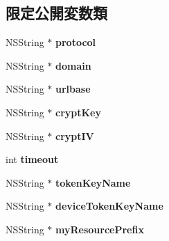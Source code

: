 \subsection*{限定公開変数類}
\begin{DoxyCompactItemize}
\item 
\hypertarget{interface_model_base_a524247cf1e9172c6c6cad9b20b621357}{}N\+S\+String $\ast$ {\bfseries protocol}\label{interface_model_base_a524247cf1e9172c6c6cad9b20b621357}

\item 
\hypertarget{interface_model_base_a23f933d9f0aecc684cbbdd7d18f47278}{}N\+S\+String $\ast$ {\bfseries domain}\label{interface_model_base_a23f933d9f0aecc684cbbdd7d18f47278}

\item 
\hypertarget{interface_model_base_a81e9cfd670fe89b8d5bafd12c30a039f}{}N\+S\+String $\ast$ {\bfseries urlbase}\label{interface_model_base_a81e9cfd670fe89b8d5bafd12c30a039f}

\item 
\hypertarget{interface_model_base_a2b81c96abcbe7e19a2003ad7ba98dd7b}{}N\+S\+String $\ast$ {\bfseries crypt\+Key}\label{interface_model_base_a2b81c96abcbe7e19a2003ad7ba98dd7b}

\item 
\hypertarget{interface_model_base_a66f740cd70a28093a3fb72e3c11dd707}{}N\+S\+String $\ast$ {\bfseries crypt\+I\+V}\label{interface_model_base_a66f740cd70a28093a3fb72e3c11dd707}

\item 
\hypertarget{interface_model_base_a82316a720d10522194e85bd50ca5ecbb}{}int {\bfseries timeout}\label{interface_model_base_a82316a720d10522194e85bd50ca5ecbb}

\item 
\hypertarget{interface_model_base_a64d4c63bb4af3ce75b44730d4f220de9}{}N\+S\+String $\ast$ {\bfseries token\+Key\+Name}\label{interface_model_base_a64d4c63bb4af3ce75b44730d4f220de9}

\item 
\hypertarget{interface_model_base_ab7192dd43002e467f3e25a8910d9d60f}{}N\+S\+String $\ast$ {\bfseries device\+Token\+Key\+Name}\label{interface_model_base_ab7192dd43002e467f3e25a8910d9d60f}

\item 
\hypertarget{interface_model_base_acae222b90eeb03aad2d9c58454e968f5}{}N\+S\+String $\ast$ {\bfseries my\+Resource\+Prefix}\label{interface_model_base_acae222b90eeb03aad2d9c58454e968f5}


\end{DoxyCompactItemize}
